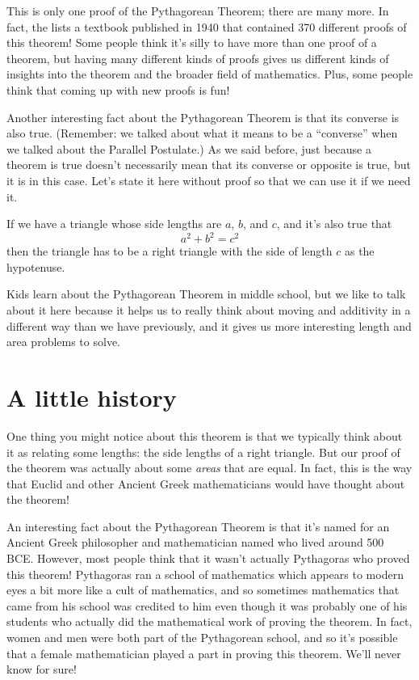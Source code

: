 \documentclass{ximera}
\begin{document}
This is only one proof of the Pythagorean Theorem; there are many more. In fact, the  lists a textbook published in 1940 that contained 370 different proofs of this theorem! Some people think it's silly to have more than one proof of a theorem, but having many different kinds of proofs gives us different kinds of insights into the theorem and the broader field of mathematics. Plus, some people think that coming up with new proofs is fun!

Another interesting fact about the Pythagorean Theorem is that its converse is also true. (Remember: we talked about what it means to be a ``converse'' when we talked about the Parallel Postulate.) As we said before, just because a theorem is true doesn't necessarily mean that its converse or opposite is true, but it is in this case. Let's state it here without proof so that we can use it if we need it.

\begin{theorem}
 If we have a triangle whose side lengths are $a$, $b$, and $c$, and it's also true that
\[
a^2 + b^2 = c^2
\]
then the triangle has to be a right triangle with the side of length $c$ as the hypotenuse.
\end{theorem}



Kids learn about the Pythagorean Theorem in middle school, but we like to talk about it here because it helps us to really think about moving and additivity in a different way than we have previously, and it gives us more interesting length and area problems to solve.


\section{A little history}
One thing you might notice about this theorem is that we typically think about it as relating some lengths: the side lengths of a right triangle. But our proof of the theorem was actually about some \emph{areas} that are equal. In fact, this is the way that Euclid and other Ancient Greek mathematicians would have thought about the theorem!

An interesting fact about the Pythagorean Theorem is that it's named for an Ancient Greek philosopher and mathematician named  who lived around 500 BCE. However, most people think that it wasn't actually Pythagoras who proved this theorem! Pythagoras ran a school of mathematics which appears to modern eyes a bit more like a cult of mathematics, and so sometimes mathematics that came from his school was credited to him even though it was probably one of his students who actually did the mathematical work of proving the theorem. In fact, women and men were both part of the Pythagorean school, and so it's possible that a female mathematician played a part in proving this theorem. We'll never know for sure!
\end{document}
